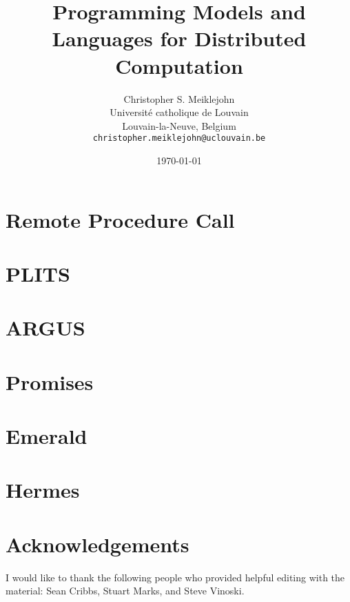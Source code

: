 \documentclass[11pt,twoside,a4paper]{article}
\theoremstyle{definition}
\theoremstyle{definition}
\theoremstyle{remark}
\begin{document}
\title{Programming Models and Languages for Distributed Computation}

\author{Christopher S. Meiklejohn\\
  Universit\'e catholique de Louvain\\
  Louvain-la-Neuve, Belgium\\
  \texttt{christopher.meiklejohn@uclouvain.be}}
  
\date{\today}
\maketitle
\clearpage

\tableofcontents

\clearpage


\section{Remote Procedure Call}

\clearpage

\section{PLITS}

\clearpage

\section{ARGUS}

\clearpage

\section{Promises}

\clearpage

\section{Emerald}

\clearpage

\section{Hermes}

\clearpage

\section*{Acknowledgements}
I would like to thank the following people who provided helpful editing with the material: Sean Cribbs, Stuart Marks, and Steve Vinoski.

\clearpage



\end{document}
